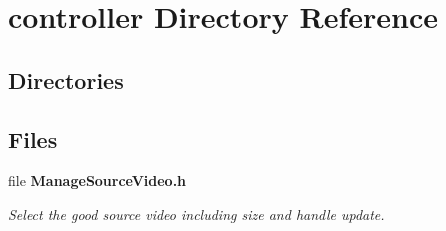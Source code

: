 \section{controller Directory Reference}
\label{dir_d3bff1ab3a40b4e5d0775c67ace1b0da}
\subsection*{Directories}
\begin{DoxyCompactItemize}
\end{DoxyCompactItemize}
\subsection*{Files}
\begin{DoxyCompactItemize}
\item 
file \textbf{ Manage\+Source\+Video.\+h}
\begin{DoxyCompactList}\small\item\em Select the good source video including size and handle update. \end{DoxyCompactList}\end{DoxyCompactItemize}
